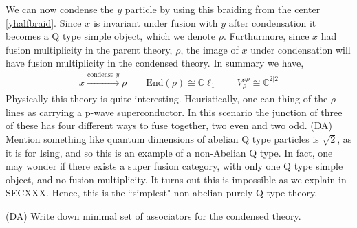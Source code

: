 \documentclass[12pt,a4paper]{article}
\newcounter{arrow}
\newcommand{\dave}[1]{{\color{ao(english)}\footnotesize{(DA) #1}}}
\begin{document}
We can now condense the $y$ particle by using this braiding from the center \ref{yhalfbraid}.
Since $x$ is invariant under fusion with $y$ after condensation it becomes a Q type simple object, which we denote $\rho$.
Furthurmore, since $x$ had fusion multiplicity in the parent theory, $\rho$, the image of $x$ under condensation will have fusion multiplicity in the condensed theory. 
In summary we have,
\begin{align}
x \xrightarrow{\text{condense $y$}} \rho \quad \quad \text{End}(\rho) \cong \mathbb{C} \ell_1 \quad \quad V^{\rho \rho}_\rho \cong \mathbb{C}^{2|2}
\end{align}
Physically this theory is quite interesting. 
Heuristically, one can thing of the $\rho$ lines as carrying a p-wave superconductor. 
In this scenario the junction of three of these has four different ways to fuse together, two even and two odd. 
\dave{Mention something like quantum dimensions of abelian Q type particles is $\sqrt{2}$, as it is for Ising, and so this is an example of a non-Abelian Q type.}
In fact, one may wonder if there exists a super fusion category, with only one Q type simple object, and no fusion multiplicity. 
It turns out this is impossible as we explain in SECXXX.
Hence, this is the ``simplest" non-abelian purely Q type theory.

\dave{Write down minimal set of associators for the condensed theory.}
\end{document}
